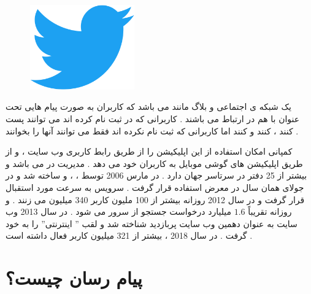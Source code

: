 \documentclass[12pt]{book}
\begin{document}
\newpage

\subsubsection{}

\begin{figure}
  \vspace{40pt}
  \begin{center}
    \includegraphics[width=0.4\textwidth]{./590px-Twitter_bird_logo_2012.svg.png}
  \end{center}
  \vspace{-20pt}
  \caption{}
  \vspace{-80pt}
\end{figure}


یک شبکه ی اجتماعی و بلاگ مانند می باشد که کاربران به صورت پیام هایی تحت عنوان 
با هم در ارتباط می باشند .
کاربرانی که در 
ثبت نام کرده اند می توانند پست کنند ، 
کنند و 
کنند اما کاربرانی که ثبت نام نکرده اند فقط می توانند آنها را بخوانند .

کمپانی
امکان استفاده از این اپلیکیشن را از طریق رابط کاربری وب سایت ، 
و از طریق اپلیکیشن های گوشی موبایل به کاربران خود می دهد .
مدیریت 
در 
می باشد و بیشتر از 25 دفتر در سرتاسر جهان دارد .
در مارس 2006 توسط
،
،
و
ساخته شد و در جولای همان سال در معرض استفاده قرار گرفت .
سرویس
به سرعت مورد استقبال قرار گرفت و در سال 2012 روزانه بیشتر از 100 ملیون کاربر 340 میلیون
می زنند .
و روزانه تقریباً
$1.6 $
میلیارد درخواست جستجو از سرور
می شود .
در سال 2013 وب سایت 
به عنوان دهمین وب سایت پربازدید شناخته شد و لقب '' اینترنتی'' را به خود گرفت .
در سال 2018 ، 
بیشتر از 321 میلیون کاربر فعال داشته است .


\newpage


\section{پیام رسان چیست؟}
\end{document}
